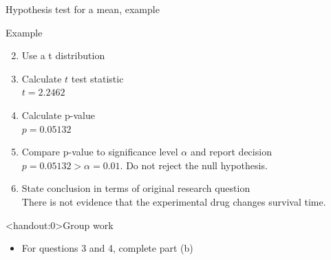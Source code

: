 \documentclass[xcolor=table]{beamer}
\begin{document}
\begin{frame}{Hypothesis test for a mean, example}
\begin{exampleblock}{Example}
\large
\begin{enumerate}
\setcounter{enumi}{1}

\item Use a t distribution
\pause\item Calculate $t$ test statistic\\
\pause$t=2.2462$
\pause\item Calculate p-value\\
\pause$p = 0.05132$
\pause\item Compare p-value to significance level $\alpha$ and report decision\\
\pause$p = 0.05132 > \alpha = 0.01$. Do not reject the null hypothesis.
\pause\item State conclusion in terms of original research question\\
\pause There is not evidence that the experimental drug changes survival time.
\end{enumerate}

\end{exampleblock}
\end{frame}

\begin{frame}<handout:0>{Group work}
\begin{block}{}
\large
\begin{itemize}
\item For questions 3 and 4, complete part (b)
\end{itemize}
\end{block}
\end{frame}
\end{document}
